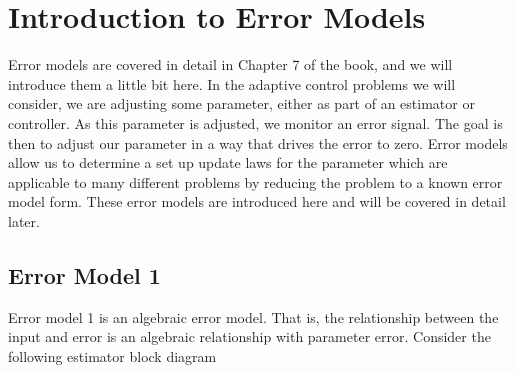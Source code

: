 \section{Introduction to Error Models}

Error models are covered in detail in Chapter 7 of the book, and we will introduce them a little bit here.
In the adaptive control problems we will consider, we are adjusting some parameter, either as part of an estimator or controller.
As this parameter is adjusted, we monitor an error signal.
The goal is then to adjust our parameter in a way that drives the error to zero.
Error models allow us to determine a set up update laws for the parameter which are applicable to many different problems by reducing the problem to a known error model form.
These error models are introduced here and will be covered in detail later.

\subsection{Error Model 1}

Error model 1 is an algebraic error model.
That is, the relationship between the input and error is an algebraic relationship with parameter error.
Consider the following estimator block diagram

